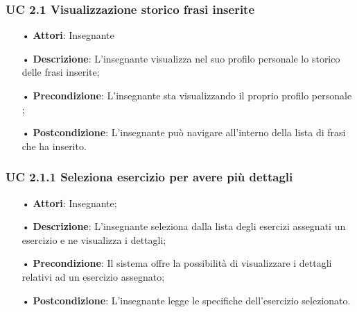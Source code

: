 


\subsubsection{UC 2.1 Visualizzazione storico frasi inserite}


\begin{itemize}
	\item[•] \textbf{Attori}:  Insegnante	   \item[•] \textbf{Descrizione}: L’insegnante visualizza nel suo profilo personale lo storico delle frasi inserite; 
	\item[•] \textbf{Precondizione}: L'insegnante sta visualizzando il proprio profilo personale ;
	\item[•] \textbf{Postcondizione}:  L’insegnante può navigare all’interno della lista di frasi che ha inserito.
\end{itemize}

\subsubsection{UC 2.1.1 Seleziona esercizio per avere più dettagli}
\begin{itemize}
	\item[•] \textbf{Attori}: Insegnante;
	\item[•] \textbf{Descrizione}:  L’insegnante seleziona dalla lista degli esercizi assegnati un esercizio e ne visualizza i dettagli;
	\item[•] \textbf{Precondizione}: Il sistema offre la possibilità di visualizzare i dettagli relativi ad un esercizio assegnato;
	\item[•] \textbf{Postcondizione}: L’insegnante legge le specifiche dell’esercizio selezionato.
\end{itemize}

